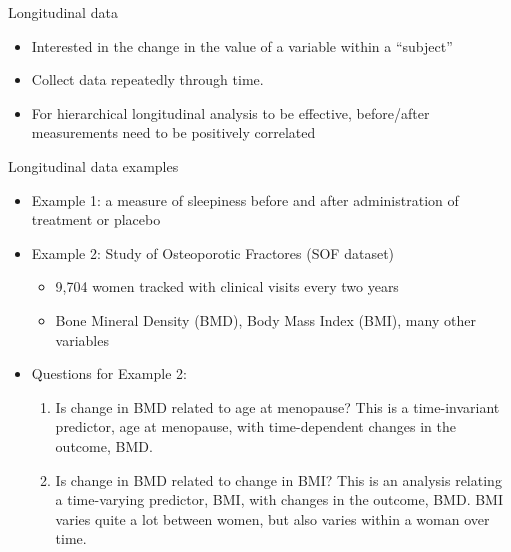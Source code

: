\documentclass[
  ignorenonframetext,
]{beamer}
\providecommand{\tightlist}{%
  \setlength{\itemsep}{0pt}\setlength{\parskip}{0pt}}
\begin{document}
\begin{frame}{Longitudinal data}
\protect\hypertarget{longitudinal-data-2}{}

\begin{itemize}
\tightlist
\item
  Interested in the change in the value of a variable within a
  ``subject''
\item
  Collect data repeatedly through time.
\item
  For hierarchical longitudinal analysis to be effective, before/after
  measurements need to be positively correlated
\end{itemize}

\end{frame}

\begin{frame}{Longitudinal data examples}
\protect\hypertarget{longitudinal-data-examples}{}

\begin{itemize}
\tightlist
\item
  Example 1: a measure of sleepiness before and after administration of
  treatment or placebo
\item
  Example 2: Study of Osteoporotic Fractores (SOF dataset)

  \begin{itemize}
  \tightlist
  \item
    9,704 women tracked with clinical visits every two years
  \item
    Bone Mineral Density (BMD), Body Mass Index (BMI), many other
    variables
  \end{itemize}
\item
  Questions for Example 2:

  \begin{enumerate}
  \tightlist
  \item
    Is change in BMD related to age at menopause? This is a
    time-invariant predictor, age at menopause, with time-dependent
    changes in the outcome, BMD.
  \item
    Is change in BMD related to change in BMI? This is an analysis
    relating a time-varying predictor, BMI, with changes in the outcome,
    BMD. BMI varies quite a lot between women, but also varies within a
    woman over time.
  \end{enumerate}
\end{itemize}

\end{frame}
\end{document}
